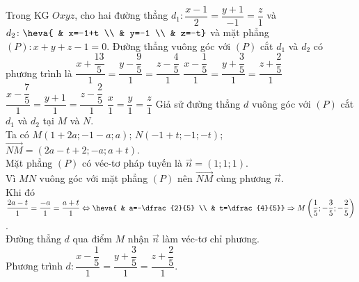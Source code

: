 \begin{ex}%
	Trong KG $Oxyz$, cho hai đường thẳng $d_1\colon \dfrac{x-1}{2}=\dfrac{y+1}{-1}=\dfrac{z}{1}$ và $d_2\colon \heva{ & x=-1+t \\ & y=-1 \\ & z=-t}$ và mặt phẳng $(P)\colon x+y+z-1=0$. Đường thẳng vuông góc với $(P)$ cắt $d_1$ và $d_2$ có phương trình là
	\choice
	{$\dfrac{x+\dfrac{13}{5}}{1}=\dfrac{y-\dfrac{9}{5}}{1}=\dfrac{z-\dfrac{4}{5}}{1}$}
	{\True $\dfrac{x-\dfrac{1}{5}}{1}=\dfrac{y+\dfrac{3}{5}}{1}=\dfrac{z+\dfrac{2}{5}}{1}$}
	{$\dfrac{x-\dfrac{7}{5}}{1}=\dfrac{y+1}{1}=\dfrac{z-\dfrac{2}{5}}{1}$}
	{$\dfrac{x}{1}=\dfrac{y}{1}=\dfrac{z}{1}$}
	\loigiai
	{
		Giả sử đường thẳng $d$ vuông góc với $(P)$ cắt $d_1$ và $d_2$ tại $M$ và $N$.\\
		Ta có $M(1+2a;-1-a;a)$; $N(-1+t;-1;-t)$; $\overrightarrow{NM}=(2a-t+2;-a;a+t)$.\\
		Mặt phẳng $(P)$ có véc-tơ pháp tuyến là $\overrightarrow{n}=(1;1;1)$.\\
		Vì $MN$ vuông góc với mặt phẳng $(P)$ nên $\overrightarrow{NM}$ cùng phương $\overrightarrow{n}$.\\
		Khi đó $\dfrac{2a-t}{1}=\dfrac{-a}{1}=\dfrac{a+t}{1} \Leftrightarrow \heva{ & a=-\dfrac{2}{5} \\ & t=\dfrac{4}{5}} \Rightarrow M\left(\dfrac{1}{5};-\dfrac{3}{5};-\dfrac{2}{5}\right)$.\\
		Đường thẳng $d$ qua điểm $M$ nhận $\overrightarrow{n}$ làm véc-tơ chỉ phương.\\
		Phương trình $d\colon \dfrac{x-\dfrac{1}{5}}{1}=\dfrac{y+\dfrac{3}{5}}{1}=\dfrac{z+\dfrac{2}{5}}{1}$.
	}
\end{ex}

